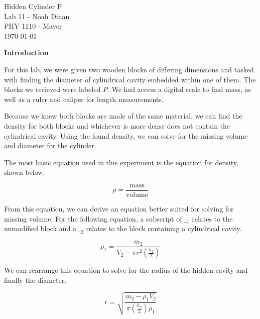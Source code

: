 \documentclass[12pt]{article}
\begin{document}
\begin{center}
\vspace*{\fill}
Hidden Cylinder P \\ Lab 11 - Noah Dinan \\ PHY 1110 - Mayer \\ \today \\
\vspace*{\fill}
\end{center}

\newpage
{} %
\setlength{\parindent}{0in}

\textbf{Introduction}\vspace{1em}

For this lab, we were given two wooden blocks of differing dimensions and tasked with finding the
diameter of cylindrical cavity embedded within one of them. The blocks we recieved were labeled $P$.
We had access a digital scale to find mass, as well as a ruler and caliper for length measurements.

\vspace{1em}

Because we knew both blocks are made of the same material, we can find the density for both blocks
and whichever is more dense does not contain the cylindrical cavity. Using the found density,
we can solve for the missing volume and diameter for the cylinder.

\vspace{1em}

The most basic equation used in this experiment is the equation for density, shown below.

\[ \rho = \frac{ \text{mass} } { \text{volume} } \]
\vspace{0.5em}

From this equation, we can derive an equation better suited for solving for missing volume.
For the following equation, a subscript of $\text{\_}_1$ relates to the unmodified block and
a $\text{\_}_2$ relates to the block containing a cylindrical cavity.

\[ \rho_1 = \frac{m_2}{V_2 - \pi r^{2} (\frac{h_2}{2})} \] 
\vspace{0.5em}

We can rearrange this equation to solve for the radius of the hidden cavity and finally the 
diameter.

\[ r = \sqrt{ \frac{m_2 - \rho_1 V_2}{\pi ( \frac{h_2}{2} ) \rho_1} } \]
\vspace{0.5em}
\end{document}
